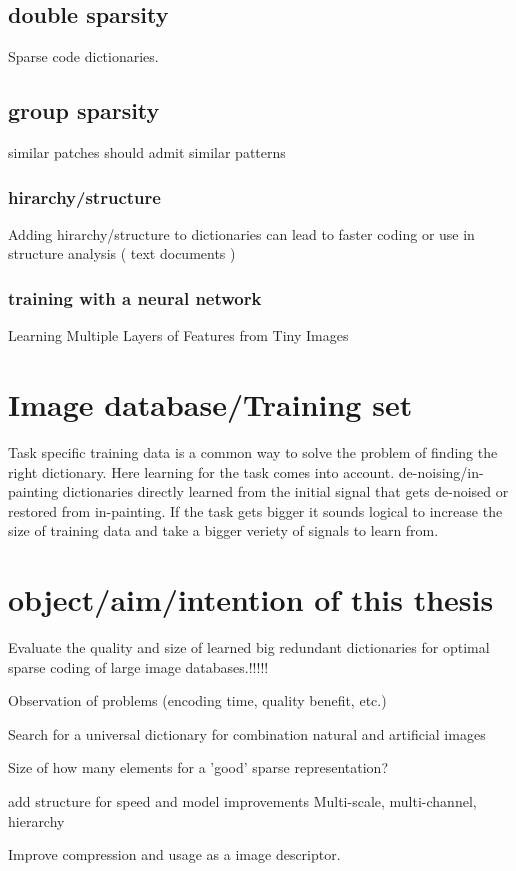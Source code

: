 \subsection{double sparsity}
Sparse code dictionaries. 

\subsection{group sparsity}
similar patches should admit similar patterns
  
\cite{double sparsity}
\subsubsection{hirarchy/structure}
Adding hirarchy/structure to dictionaries can lead to faster coding or use in structure analysis ( text documents )
\cite{Jenatton2010}
\subsubsection{training with a neural network}
Learning Multiple Layers of Features from Tiny Images \cite{Krizhevsky2009}


\section{Image database/Training set}
Task specific training data is a common way to solve the problem of finding the right dictionary. 
Here learning for the task comes into account. de-noising/in-painting dictionaries directly learned from the initial
signal that gets de-noised or restored from in-painting.
If the task gets bigger it sounds logical to increase the size of training data and take a bigger veriety of signals to learn from.


\section{object/aim/intention of this thesis}
Evaluate the quality and size of learned big redundant dictionaries for 
optimal sparse coding of large image databases.!!!!!

Observation of problems (encoding time, quality benefit, etc.)

Search for a universal dictionary for combination natural and artificial images
 
Size of 
how many elements for a 'good' sparse representation?

add structure for speed and model improvements
Multi-scale, multi-channel, hierarchy

Improve compression and usage as a image descriptor.
